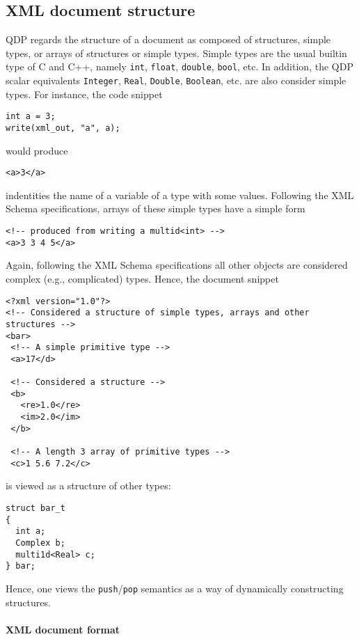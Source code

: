 \documentclass[12pt,letterpaper]{article}
\begin{document}
\subsection{XML document structure}
\label{sec:xmldoc}

QDP regards the structure of a document as composed of structures,
simple types, or arrays of structures or simple types. Simple types
are the usual builtin type of C and C++, namely \verb|int|,
\verb|float|, \verb|double|, \verb|bool|, etc. In addition, the QDP
scalar equivalents \verb|Integer|, \verb|Real|, \verb|Double|,
\verb|Boolean|, etc.  are also consider simple types. For instance, the
code snippet
%
\begin{verbatim}
int a = 3;
write(xml_out, "a", a);
\end{verbatim}
%
would produce
\begin{verbatim}
<a>3</a>
\end{verbatim}
%
indentities the name of a variable of a type with some values.
Following the XML Schema specifications, arrays of these simple types
have a simple form
\begin{verbatim}
<!-- produced from writing a multid<int> -->
<a>3 3 4 5</a>
\end{verbatim}

Again, following the XML Schema specifications all other objects are
considered complex (e.g., complicated) types. Hence, the document snippet
%
\begin{verbatim}
<?xml version="1.0"?>
<!-- Considered a structure of simple types, arrays and other structures -->
<bar>
 <!-- A simple primitive type -->
 <a>17</d>

 <!-- Considered a structure -->
 <b>
   <re>1.0</re>
   <im>2.0</im>
 </b>

 <!-- A length 3 array of primitive types -->
 <c>1 5.6 7.2</c>
\end{verbatim}
%
is viewed as a structure of other types:
\begin{verbatim}
struct bar_t
{
  int a;
  Complex b;
  multi1d<Real> c;
} bar;
\end{verbatim}
%
Hence, one views the \verb|push|/\verb|pop| semantics as a way of
dynamically constructing structures. 

\paragraph{XML document format}
\end{document}
